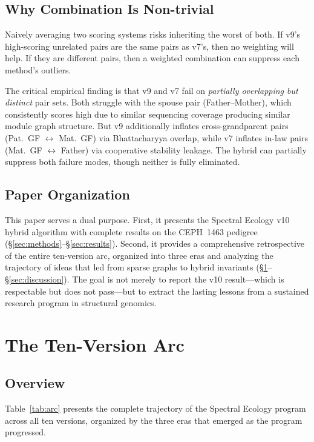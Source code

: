 \documentclass{../yalumba}
\begin{document}
\subsection{Why Combination Is Non-trivial}

Naively averaging two scoring systems risks inheriting the worst of both.
If v9's high-scoring unrelated pairs are the same pairs as v7's, then
no weighting will help.  If they are different pairs, then a weighted
combination can suppress each method's outliers.

The critical empirical finding is that v9 and v7 fail on \emph{partially
overlapping but distinct} pair sets.  Both struggle with the spouse pair
(Father--Mother), which consistently scores high due to similar
sequencing coverage producing similar module graph structure.  But v9
additionally inflates cross-grandparent pairs (Pat.~GF $\leftrightarrow$
Mat.~GF) via Bhattacharyya overlap, while v7 inflates in-law pairs
(Mat.~GF $\leftrightarrow$ Father) via cooperative stability leakage.
The hybrid can partially suppress both failure modes, though neither
is fully eliminated.

\subsection{Paper Organization}

This paper serves a dual purpose.  First, it presents the Spectral
Ecology v10 hybrid algorithm with complete results on the CEPH~1463
pedigree (\S\ref{sec:methods}--\S\ref{sec:results}).  Second, it
provides a comprehensive retrospective of the entire ten-version arc,
organized into three eras and analyzing the trajectory of ideas that led
from sparse graphs to hybrid invariants
(\S\ref{sec:arc}--\S\ref{sec:discussion}).  The goal is not merely to
report the v10 result---which is respectable but does not pass---but to
extract the lasting lessons from a sustained research program in
structural genomics.


\section{The Ten-Version Arc}
\label{sec:arc}

\subsection{Overview}

Table~\ref{tab:arc} presents the complete trajectory of the Spectral
Ecology program across all ten versions, organized by the three eras
that emerged as the program progressed.
\end{document}

